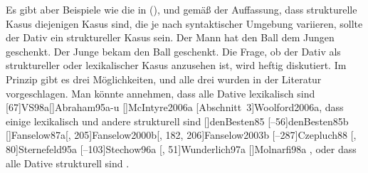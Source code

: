 Es gibt aber Beispiele wie die in (), und gemäß der Auffassung, dass strukturelle Kasus
diejenigen Kasus sind, die je nach syntaktischer Umgebung variieren, sollte der Dativ ein struktureller Kasus sein.
\eal
\ex 
Der Mann  hat   den Ball dem Jungen geschenkt.
\ex 
Der Junge bekam den Ball geschenkt.
\zl
Die Frage, ob der Dativ als struktureller oder lexikalischer Kasus anzusehen ist, wird heftig
diskutiert. Im Prinzip gibt es drei Möglichkeiten, und alle drei wurden in der
Literatur vorgeschlagen. Man könnte annehmen, dass alle Dative lexikalisch sind
\parencites[]{Haider85b}%
[]{Haider86}[, 217, 228]{HM94a}%
{Mueller99a,Mueller2001a}[]{Mueller2003e}%
[]{Scherpenisse86a}%
[, 291]{Pollard94a}%
[67]{VS98a}[]{Abraham95a-u}%
[]{McIntyre2006a}%
[Abschnitt~3]{Woolford2006a},
dass einige lexikalisch und andere strukturell sind
\parencites
{Wegener85a}%
{Wegener90}%
[]{denBesten85}%
[--56]{denBesten85b}%
[]{Fanselow87a}[, 205]{Fanselow2000b}[, 182, 206]{Fanselow2003b}%
[--287]{Czepluch88}%
[, 80]{Sternefeld95a}%
[--103]{Stechow96a}%
[, 51]{Wunderlich97a}%
[]{Molnarfi98a}%
, oder dass alle Dative strukturell sind
\parencites[]{Sternefeld95a}%
[, 205--206]{Ryu97a}%
[--97]{Gunkel2003b}.%

